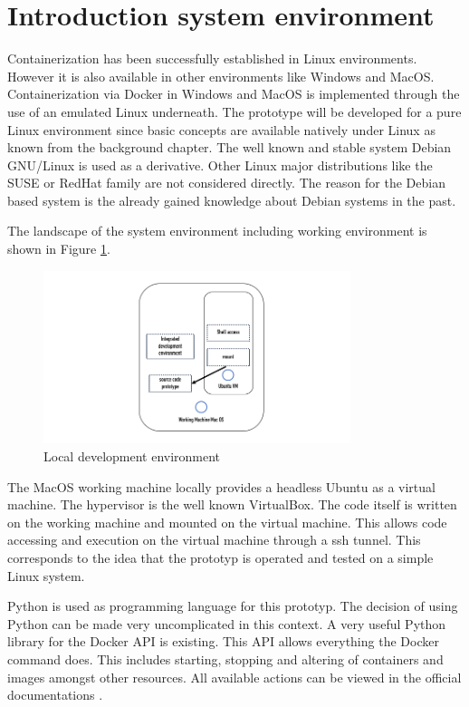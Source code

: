\section{Introduction system environment}
\label{ch:practical_realization:sys_env}

Containerization has been successfully established in Linux environments.
However it is also available in other environments like Windows and MacOS.
Containerization via Docker in Windows and MacOS is implemented through the use of an emulated Linux underneath.
The prototype will be developed for a pure Linux environment since basic concepts are available natively under Linux as known from the background chapter.
The well known and stable system Debian GNU/Linux is used as a derivative. 
Other Linux major distributions like the SUSE or RedHat family are not considered directly.
The reason for the Debian based system is the already gained knowledge about Debian systems in the past. 

The landscape of the system environment including working environment is shown in Figure \ref{fig:pract:sys_env}.
\begin{figure}[h!]
 \centering
 \includegraphics[width=0.8\textwidth]{gfx/examples/sys_env.png}
 \caption{Local development environment}
 \label{fig:pract:sys_env}
\end{figure}
The MacOS working machine locally provides a headless Ubuntu as a virtual machine. 
The hypervisor is the well known VirtualBox.
The code itself is written on the working machine and mounted on the virtual machine. 
This allows code accessing and execution on the virtual machine through a ssh tunnel. 
This corresponds to the idea that the prototyp is operated and tested on a simple Linux system.

Python is used as programming language for this prototyp. 
The decision of using Python can be made very uncomplicated in this context. 
A very useful Python library for the Docker API is existing. 
This API allows everything the Docker command does. 
This includes starting, stopping and altering of containers and images amongst other resources. 
All available actions can be viewed in the official documentations \cite{python_sdk}. 

